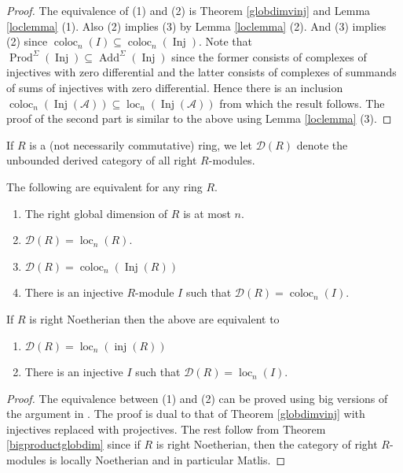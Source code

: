 \documentclass[12pt,oneside]{amsart}
\DeclareMathOperator*{\Inj}{Inj}
\DeclareMathOperator{\coloc}{coloc}
\DeclareMathOperator{\loc}{loc}
\DeclareMathOperator{\inj}{inj}
\DeclareMathOperator{\Add}{Add}
\DeclareMathOperator{\Prod}{Prod}
\begin{document}
\begin{proof}
The equivalence of (1) and (2) is Theorem \ref{globdimvinj} and Lemma \ref{loclemma} (1). Also (2) implies (3) by Lemma \ref{loclemma} (2). And (3) implies (2) since $\coloc_n(I) \subseteq \coloc_n(\Inj)$. Note that $\Prod^\Sigma(\Inj) \subseteq \Add^{\Sigma}(\Inj)$ since the former consists of complexes of injectives with zero differential and the latter consists of complexes of summands of sums of injectives with zero differential. Hence there is an inclusion $\coloc_n(\Inj(\mathcal{A})) \subseteq \loc_n(\Inj(\mathcal{A}))$ from which the result follows. The proof of the second part is similar to the above using Lemma \ref{loclemma} (3).
\end{proof}

If $R$ is a (not necessarily commutative) ring, we let $\mathcal{D}(R)$ denote the unbounded derived category of all right $R$-modules.

\begin{theorem} The following are equivalent for any ring $R$. 
\begin{enumerate}
\item The right global dimension of $R$ is at most $n$.
\item $\mathcal{D}(R) = \loc_n(R)$.
\item $\mathcal{D}(R) = \coloc_n(\Inj(R))$
\item There is an injective $R$-module $I$ such that $\mathcal{D}(R) = \coloc_n(I)$.
\end{enumerate}
If $R$ is right Noetherian then the above are equivalent to 
\begin{enumerate}
\item $\mathcal{D}(R) = \loc_n(\inj(R))$ 
\item There is an injective $I$ such that  $\mathcal{D}(R) = \loc_n(I)$.
\end{enumerate}

\end{theorem}

\begin{proof}
The equivalence between (1) and (2) can be proved using big versions of the argument in \cite[Lemma 2.4]{KK05}. The proof is dual to that of Theorem \ref{globdimvinj} with injectives replaced with projectives.  The rest follow from Theorem \ref{bigproductglobdim} since if $R$ is right Noetherian, then the category of right $R$-modules is locally Noetherian and in particular Matlis. 
\end{proof}
\end{document}
